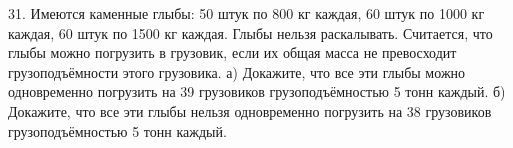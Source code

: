 31. Имеются каменные глыбы: 50 штук по 800 кг каждая, 60 штук по 1000 кг каждая, 60 штук по 1500 кг каждая. Глыбы нельзя раскалывать. Считается, что глыбы можно погрузить в грузовик, если их общая масса не превосходит грузоподъёмности этого грузовика. а) Докажите, что все эти глыбы можно одновременно погрузить на 39 грузовиков грузоподъёмностью 5 тонн каждый. б) Докажите, что все эти глыбы нельзя одновременно погрузить на 38 грузовиков грузоподъёмностью 5 тонн каждый.\\
